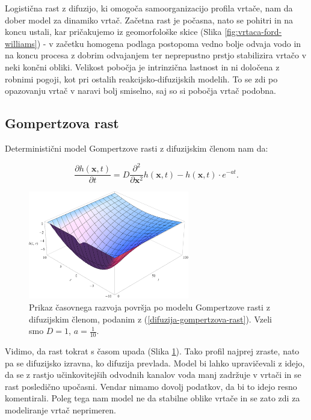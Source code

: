 \documentclass[a4paper, twoside, 12pt]{book}
\begin{document}
Logistična rast z difuzijo, ki omogoča samoorganizacijo profila vrtače, nam da dober model za dinamiko vrtač. Začetna rast je počasna, nato se pohitri in na koncu ustali, kar pričakujemo iz geomorfološke skice (Slika \ref{fig:vrtaca-ford-williams}) - v začetku homogena podlaga postopoma vedno bolje odvaja vodo in na koncu procesa z dobrim odvajanjem ter neprepustno prstjo stabilizira vrtačo v neki končni obliki.
Velikost pobočja je intrinzična lastnost in ni določena z robnimi pogoji, kot pri ostalih reakcijsko-difuzijskih modelih. To se zdi po opazovanju vrtač v naravi bolj smiselno, saj so si pobočja vrtač podobna.

    \subsection{Gompertzova rast}

    Deterministični model Gompertzove rasti z difuzijskim členom nam da:

    \begin{equation}
      \frac{ \partial h(\mathbf{x},t) }{ \partial t} = D \frac{\partial^2}{ \partial \mathbf{x}^2} h(\mathbf{x},t) - h(\mathbf{x},t) \cdot e^{-a t}.
      \label{difuzija-gompertzova-rast}
    \end{equation}
    \begin{figure}[h!]
      \begin{center}
        \includegraphics[width=7cm]{slike/difuzija-gompertzova-rast2}
      \end{center}
      \caption{Prikaz časovnega razvoja površja po modelu Gompertzove rasti z difuzijskim členom, podanim z (\ref{difuzija-gompertzova-rast}). Vzeli smo $D=1$, $a=\frac{1}{10}$.}
      \label{fig:difuzija-gompertzova-rast}
    \end{figure}

    Vidimo, da rast tokrat s časom upada (Slika \ref{fig:difuzija-gompertzova-rast}). Tako profil najprej zraste, nato pa se difuzijsko izravna, ko difuzija prevlada.
    Model bi lahko upravičevali z idejo, da se z rastjo učinkovitejših odvodnih kanalov voda manj zadržuje v vrtači in se rast posledično upočasni. Vendar nimamo dovolj podatkov, da bi to idejo resno komentirali. Poleg tega nam model ne da stabilne oblike vrtače in se zato zdi za modeliranje vrtač neprimeren.
\end{document}
